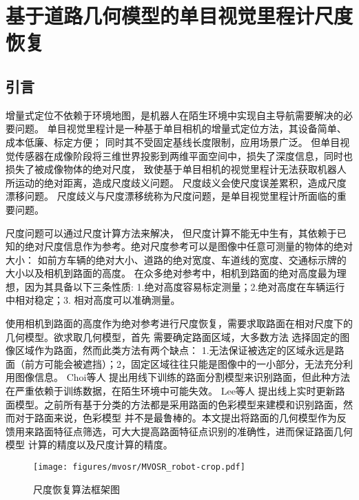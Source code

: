 \chapter{基于道路几何模型的单目视觉里程计尺度恢复}
\label{ch:mvosr}
\section{引言}
增量式定位不依赖于环境地图，是机器人在陌生环境中实现自主导航需要解决的必要问题。
单目视觉里程计是一种基于单目相机的增量式定位方法，其设备简单、成本低廉、标定方便；
同时其不受固定基线长度限制，应用场景广泛。
但单目视觉传感器在成像阶段将三维世界投影到两维平面空间中，损失了深度信息，同时也损失了被成像物体的绝对尺度，
致使基于单目相机的视觉里程计无法获取机器人所运动的绝对距离，造成尺度歧义问题。
尺度歧义会使尺度误差累积，造成尺度漂移问题。
尺度歧义与尺度漂移统称为尺度问题，是单目视觉里程计所面临的重要问题。

尺度问题可以通过尺度计算方法来解决，
但尺度计算不能无中生有，其依赖于已知的绝对尺度信息作为参考。绝对尺度参考可以是图像中任意可测量的物体的绝对大小：
如前方车辆的绝对大小、道路的绝对宽度、车道线的宽度、交通标示牌的大小以及相机到路面的高度。
在众多绝对参考中，相机到路面的绝对高度最为理想，因为其具备以下三条性质:
1.绝对高度容易标定测量；2.绝对高度在车辆运行中相对稳定；3. 相对高度可以准确测量。

使用相机到路面的高度作为绝对参考进行尺度恢复，需要求取路面在相对尺度下的几何模型。欲求取几何模型，首先
需要确定路面区域，大多数方法\cite{kitt2011mono,Song2015MoncularScale,zhou2016reliable}
选择固定的图像区域作为路面，然而此类方法有两个缺点：
1.无法保证被选定的区域永远是路面（前方可能会被遮挡）；2，固定区域往往只能是图像中的一小部分，无法充分利用图像信息。
Choi等人\cite{choi2011what} 提出用线下训练的路面分割模型来识别路面，但此种方法在严重依赖于训练数据，在陌生环境中可能失效。
Lee等人\cite{Lee2015MoncularScale}
提出线上实时更新路面模型。之前所有基于分类的方法都是采用路面的色彩模型来建模和识别路面，然而对于路面来说，色彩模型
并不是最鲁棒的。本文提出将路面的几何模型作为反馈用来路面特征点筛选，可大大提高路面特征点识别的准确性，进而保证路面几何模型
计算的精度以及尺度计算的精度。
\begin{figure}[t]
    \centering
    \texttt{[image: figures/mvosr/MVOSR\_robot-crop.pdf]}
    \caption{尺度恢复算法框架图}
    \label{fig:mvosr_structure}
  \end{figure}

